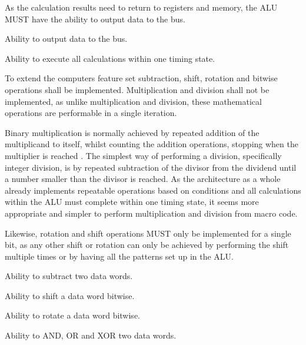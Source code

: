 As the calculation results need to return to registers and memory, the ALU MUST have the ability to output data to the bus.
\begin{arch-requirement}
  Ability to output data to the bus. 
\end{arch-requirement}

\begin{arch-requirement}
  Ability to execute all calculations within one timing state.
\end{arch-requirement}

To extend the computers feature set subtraction, shift, rotation and bitwise operations shall be implemented. Multiplication and division shall not be implemented, as unlike multiplication and division, these mathematical operations are performable in a single iteration. 

Binary multiplication is normally achieved by repeated addition of the multiplicand to itself, whilst counting the addition operations, stopping when the multiplier is reached \cite{cit.needed}. The simplest way of performing a division, specifically integer division, is by repeated subtraction of the divisor from the dividend until a number smaller than the divisor is reached.
As the architecture as a whole already implements repeatable operations based on conditions and all calculations within the ALU must complete within one timing state, it seems more appropriate and simpler to perform multiplication and division from macro code. 

Likewise, rotation and shift operations MUST only be implemented for a single bit, as any other shift or rotation can only be achieved by performing the shift multiple times or by having all the patterns set up in the ALU. %

\begin{feat-requirement}
  Ability to subtract two data words.
\end{feat-requirement}

\begin{feat-requirement}
  Ability to shift a data word bitwise.
\end{feat-requirement}

\begin{feat-requirement}
  Ability to rotate a data word bitwise.
\end{feat-requirement}

\begin{feat-requirement}
  Ability to AND, OR and XOR two data words.
\end{feat-requirement}

